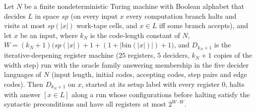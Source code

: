 \begin{theorem}
\label{Complexity.LogProg.SavitchARM.dp_run}
\leanok
{}
Let $N$ be a finite nondeterministic Turing machine with Boolean alphabet that decides $L$ in space $\mathit{sp}$ (on every input $x$ every computation branch halts and visits at most $\mathit{sp}(|x|)$ work-tape cells, and $x\in L$ iff some branch accepts), and let
$x$ be an input, where $k_N$ is the code-length constant of $N$, $W=(k_N+1)\bigl(\mathit{sp}(|x|)+1+(1+|\mathrm{bin}(|x|)|)+1\bigr)$, and $D_{k_N+1}$ is the iterative-deepening register machine ($25$ registers, $5$ deciders, $k_N+1$ copies of the width step) run with the oracle family answering membership in the five decider languages of $N$ (input length, initial codes, accepting codes, step pairs and edge codes). Then $D_{k_N+1}$ on $x$, started at its setup label with every
register $0$, halts with answer $[x\in L]$ along a run whose configurations before halting satisfy
the syntactic preconditions and have all registers at most $2^{W\cdot W}$.
\end{theorem}

